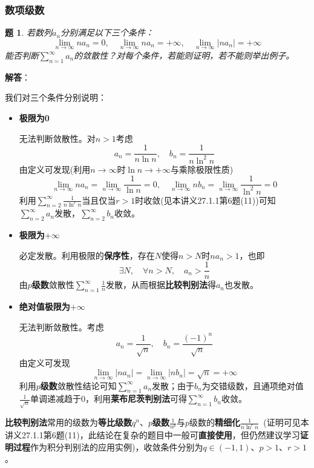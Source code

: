 \documentclass[a4paper,UTF8,fontset=windows,AutoFakeBold]{ctexart}
\newcommand*{\suminf}[1][n=1]{\sum_{#1}^\infty}
\newcommand*{\note}{\noindent *}
\theoremstyle{ex}
\newtheorem{exercise}{题}
\newcommand{\sol}[1]{{\vspace{5pt}\kaishu\noindent\textbf{解答}：\vspace{-3pt}
\begin{compactitem}
    \item[] #1
\end{compactitem}
}}
\begin{document}
\subsubsection{数项级数}
\begin{framed}
\begin{exercise}
    若数列$a_n$分别满足以下三个条件：
    $$\lim_{n\to\infty}na_n=0,\quad\lim_{n\to\infty}na_n=+\infty,\quad\lim_{n\to\infty}|na_n|=+\infty$$
    能否判断$\suminf a_n$的敛散性？对每个条件，若能则证明，若不能则举出例子。
\end{exercise}
\sol{
    我们对三个条件分别说明：
    \begin{itemize}
        \item \textbf{极限为0}
        
        无法判断敛散性。对$n>1$考虑
        $$a_n=\frac{1}{n\ln n},\quad b_n=\frac{1}{n\ln^2n}$$
        由定义可发现(利用$n\to\infty$时$\ln n\to+\infty$与乘除极限性质)
        $$\lim_{n\to\infty}na_n=\lim_{n\to\infty}\frac{1}{\ln n}=0,\quad\lim_{n\to\infty}nb_n=\lim_{n\to\infty}\frac{1}{\ln^2n}=0$$
        利用$\suminf[n=2]\frac{1}{n\ln^rn}$当且仅当$r>1$时收敛(见本讲义27.1.1第6题(11))可知$\suminf[n=2]a_n$发散，$\suminf[n=2]b_n$收敛。

        \item \textbf{极限为$+\infty$}
        
        必定发散。利用极限的\textbf{保序性}，存在$N$使得$n>N$时$na_n>1$，也即
        $$\exists N,\quad\forall n>N,\quad a_n>\frac{1}{n}$$
        由\textbf{$p$级数}敛散性$\suminf\frac{1}{n}$发散，从而根据\textbf{比较判别法}得$a_n$也发散。

        \item \textbf{绝对值极限为$+\infty$}
        
        无法判断敛散性。考虑
        $$a_n=\frac{1}{\sqrt{n}},\quad b_n=\frac{(-1)^n}{\sqrt{n}}$$
        由定义可发现
        $$\lim_{n\to\infty}|na_n|=\lim_{n\to\infty}|nb_n|=\sqrt{n}=+\infty$$
        利用\textbf{$p$级数}敛散性结论可知$\suminf a_n$发散；由于$b_n$为交错级数，且通项绝对值$\frac{1}{\sqrt{n}}$单调递减趋于0，利用\textbf{莱布尼茨判别法}可得$\suminf b_n$收敛。
    \end{itemize}
}
\end{framed}

\note \textbf{比较判别法}常用的级数为\textbf{等比级数}$q^n$、\textbf{$p$级数}$\frac{1}{n^p}$与$p$级数的\textbf{精细化}$\frac{1}{n\ln^rn}$\ (证明可见本讲义27.1.1第6题(11)，此结论在复杂的题目中一般可\textbf{直接使用}，但仍然建议学习\textbf{证明过程}作为积分判别法的应用实例)，收敛条件分别为$q\in(-1,1)$、$p>1$、$r>1$。
\end{document}
